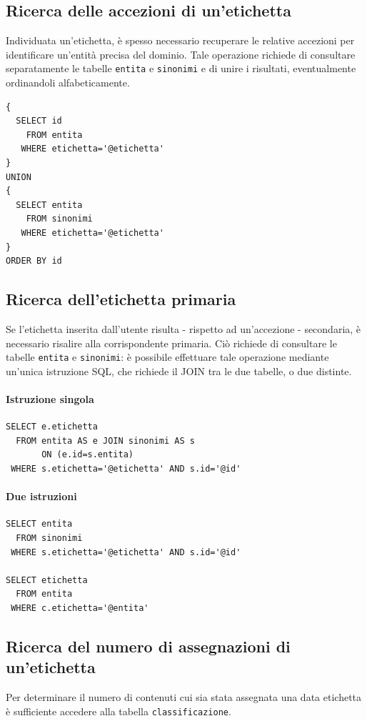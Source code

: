 \documentclass[10pt,a4paper,headinclude,footinclude,hidelinks]{scrreprt} %
\begin{document}
	\subsection{Ricerca delle accezioni di un'etichetta}
	\label{ch:stage:er:operazioni:etichette:accezioni}
	Individuata un'etichetta, è spesso necessario recuperare le relative accezioni per identificare un'entità precisa del dominio. Tale operazione richiede di consultare separatamente le tabelle \texttt{entita} e \texttt{sinonimi} e di unire i risultati, eventualmente ordinandoli alfabeticamente.

\begin{verbatim}
{
  SELECT id
    FROM entita	
   WHERE etichetta='@etichetta'
}
UNION
{
  SELECT entita
    FROM sinonimi	
   WHERE etichetta='@etichetta'
}
ORDER BY id
\end{verbatim}

	\subsection{Ricerca dell'etichetta primaria}
	\label{ch:stage:er:operazioni:etichette:ricerca-primaria}
	Se l'etichetta inserita dall'utente risulta - rispetto ad un'accezione - secondaria, è necessario risalire alla corrispondente primaria. Ciò richiede di consultare le tabelle \texttt{entita} e \texttt{sinonimi}: è possibile effettuare tale operazione mediante un'unica istruzione SQL, che richiede il JOIN tra le due tabelle, o due distinte.

\paragraph{Istruzione singola}
\begin{verbatim}
SELECT e.etichetta
  FROM entita AS e JOIN sinonimi AS s
       ON (e.id=s.entita)
 WHERE s.etichetta='@etichetta' AND s.id='@id'
\end{verbatim}

\paragraph{Due istruzioni}
\begin{verbatim}
SELECT entita
  FROM sinonimi	
 WHERE s.etichetta='@etichetta' AND s.id='@id'

SELECT etichetta
  FROM entita	
 WHERE c.etichetta='@entita'
\end{verbatim}

	\subsection{Ricerca del numero di assegnazioni di un'etichetta}
	\label{ch:stage:er:operazioni:etichette:occorrenze}
	Per determinare il numero di contenuti cui sia stata assegnata una data etichetta è sufficiente accedere alla tabella \texttt{classificazione}.
\end{document}
